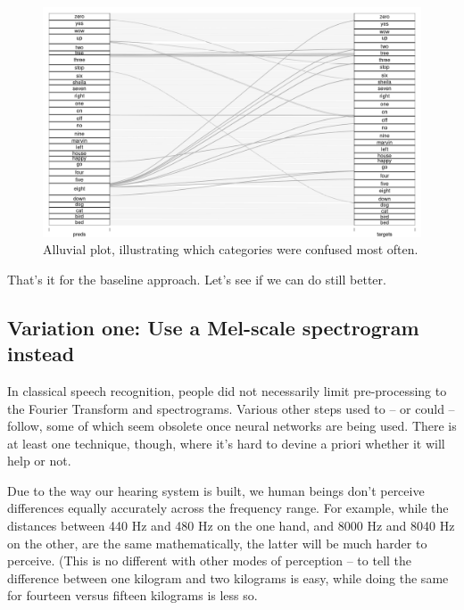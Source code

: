 \documentclass[
  letterpaper,
]{krantz}
\begin{document}
\begin{figure}[H]

{\centering \includegraphics{images/audio-alluvial-baseline.png}

}

\caption{\label{fig-audio-alluvial-baseline}Alluvial plot, illustrating
which categories were confused most often.}

\end{figure}

That's it for the baseline approach. Let's see if we can do still
better.

\hypertarget{variation-one-use-a-mel-scale-spectrogram-instead}{%
\subsection{\texorpdfstring{Variation one: Use a
Mel-scale spectrogram
instead}{Variation one: Use a Mel-scale spectrogram instead}}\label{variation-one-use-a-mel-scale-spectrogram-instead}}

In classical speech recognition, people did not necessarily limit
pre-processing to the Fourier Transform and spectrograms. Various other
steps used to -- or could -- follow, some of which seem obsolete once
neural networks are being used. There is at least one technique, though,
where it's hard to devine a priori whether it will help or not.

Due to the way our hearing system is built, we human beings don't
perceive differences equally accurately across the frequency range. For
example, while the distances between 440 Hz and 480 Hz on the one hand,
and 8000 Hz and 8040 Hz on the other, are the same mathematically, the
latter will be much harder to perceive. (This is no different with other
modes of perception -- to tell the difference between one kilogram and
two kilograms is easy, while doing the same for fourteen versus fifteen
kilograms is less so.
\end{document}
